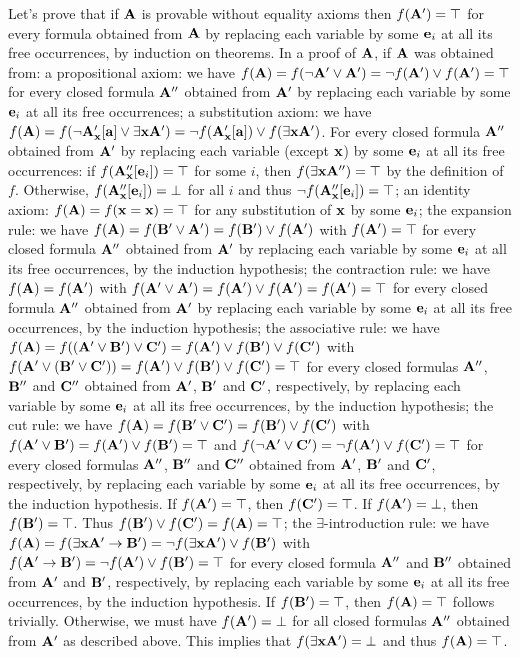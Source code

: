 Let's prove that if ${\bf A}$ is provable without equality axioms then $f({\bf A}') = \top$ for every formula obtained from ${\bf A}$ by 
replacing each variable by some ${\bf e}_i$ at all its free occurrences, by induction on theorems.
In a proof of ${\bf A}$, if ${\bf A}$ was obtained from:
\itemitem{$\bullet$} a propositional axiom: we have $f({\bf A}) = f(\neg {\bf A}' \lor {\bf A}') = \neg f({\bf A}') \lor f({\bf A}') = \top$ 
for every closed formula ${\bf A}''$ obtained from ${\bf A}'$ by replacing each variable by some ${\bf e}_i$ at all its free occurrences;
\itemitem{$\bullet$} a substitution axiom: we have $f({\bf A}) = f(\neg {\bf A}'_{\bf x}[{\bf a}] \lor \exists {\bf x}{\bf A}') = \neg f({\bf A}'_{\bf x}[{\bf a}]) \lor f(\exists {\bf x}{\bf A}')$.
For every closed formula ${\bf A}''$ obtained from ${\bf A}'$ by replacing each variable (except ${\bf x}$) by some ${\bf e}_i$ at all its free occurrences: if
$f({\bf A}''_{\bf x}[{\bf e}_i]) = \top$ for some $i$, then $f(\exists {\bf x}{\bf A}'') = \top$ by the definition of $f$. Otherwise, $f({\bf A}''_{\bf x}[{\bf e}_i]) = \bot$ for all $i$
and thus $\neg f({\bf A}''_{\bf x}[{\bf e}_i]) = \top$;
\itemitem{$\bullet$} an identity axiom: $f({\bf A}) = f({\bf x} = {\bf x}) = \top$ for any substitution of ${\bf x}$ by some ${\bf e}_i$;
\itemitem{$\bullet$} the expansion rule: we have $f({\bf A}) = f({\bf B}' \lor {\bf A}') = f({\bf B}') \lor f({\bf A}')$ with $f({\bf A}') = \top$ 
for every closed formula ${\bf A}''$ obtained from ${\bf A}'$ by replacing each variable by some ${\bf e}_i$ at all its free occurrences, by the induction hypothesis;
\itemitem{$\bullet$} the contraction rule: we have $f({\bf A}) = f({\bf A}')$ with $f({\bf A}' \lor {\bf A}') = f({\bf A}') \lor f({\bf A}') = f({\bf A}') = \top$ 
for every closed formula ${\bf A}''$ obtained from ${\bf A}'$ by replacing each variable by some ${\bf e}_i$ at all its free occurrences, by the induction hypothesis;
\itemitem{$\bullet$} the associative rule: we have $f({\bf A}) = f(({\bf A}' \lor {\bf B}') \lor {\bf C}') = f({\bf A}') \lor f({\bf B}') \lor f({\bf C}')$ 
with $f({\bf A}' \lor ({\bf B}' \lor {\bf C}')) = f({\bf A}') \lor f({\bf B}') \lor f({\bf C}') = \top$ 
for every closed formulas ${\bf A}''$, ${\bf B}''$ and ${\bf C}''$ obtained from ${\bf A}'$, ${\bf B}'$ and ${\bf C}'$, respectively, by replacing each variable by 
some ${\bf e}_i$ at all its free occurrences, by the induction hypothesis;
\itemitem{$\bullet$} the cut rule: we have $f({\bf A}) = f({\bf B}' \lor {\bf C}') = f({\bf B}') \lor f({\bf C}')$ with $f({\bf A}' \lor {\bf B}') = f({\bf A}') \lor f({\bf B}') = \top$ 
and $f(\neg {\bf A}' \lor {\bf C}') = \neg f({\bf A}') \lor f({\bf C}') = \top$ for every closed formulas ${\bf A}''$, ${\bf B}''$ and ${\bf C}''$ obtained from ${\bf A}'$, ${\bf B}'$ and ${\bf C}'$, 
respectively, by replacing each variable by some ${\bf e}_i$ at all its free occurrences, by the induction hypothesis.
If $f({\bf A}') = \top$, then $f({\bf C}') = \top$. If $f({\bf A}') = \bot$, then $f({\bf B}') = \top$. Thus $f({\bf B}') \lor f({\bf C}') = f({\bf A}) = \top$;
\itemitem{$\bullet$} the $\exists$-introduction rule: we have $f({\bf A}) = f(\exists {\bf x}{\bf A}' \to {\bf B}') = \neg f(\exists {\bf x}{\bf A}') \lor f({\bf B}')$ 
with $f({\bf A}' \to {\bf B}') = \neg f({\bf A}') \lor f({\bf B}') = \top$ for every closed formula ${\bf A}''$ and ${\bf B}''$ obtained from ${\bf A}'$ and ${\bf B}'$, respectively, 
by replacing each variable by some ${\bf e}_i$ at all its free occurrences, by the induction hypothesis. If $f({\bf B}') = \top$, then $f({\bf A}) = \top$ follows 
trivially. Otherwise, we must have $f({\bf A}') = \bot$ for all closed formulas ${\bf A}''$ obtained from ${\bf A}'$ as described above. This implies that
$f(\exists {\bf x}{\bf A}') = \bot$ and thus $f({\bf A}) = \top$.

